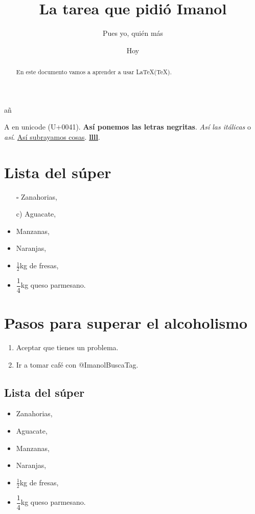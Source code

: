 \documentclass[a4paper,12pt]{article}
\title{La tarea que pidió Imanol} %
\author{Pues yo, quién más}  %
\date{Hoy} %
\begin{document}
\maketitle %
añ 

\begin{abstract}
	En este documento vamos a aprender a usar \LaTeX (\TeX).
\end{abstract}


A en unicode (U+0041). \textbf{Así ponemos las letras negritas}. \emph{Así las itálicas} o \textit{así}. \underline{Así subrayamos cosas}. \textbf{\underline{llll}}.\\
\section{Lista del súper}
\begin{itemize}
\item[$\square$] Zanahorias, 
\item[c)] Aguacate,
\item Manzanas,
\item Naranjas,
\item $\frac{1}{2}$kg de fresas, %
\item $\dfrac{1}{4}$kg queso parmesano.%
\end{itemize}

\section{Pasos para superar el alcoholismo}
\begin{enumerate}
\item Aceptar que tienes un problema.
\item Ir a tomar café con @ImanolBuscaTag.
\end{enumerate}

\subsection{Lista del súper}
\begin{itemize}[label=$\square$]
\item Zanahorias, 
\item Aguacate,
\item Manzanas,
\item Naranjas,
\item $\frac{1}{2}$kg de fresas, %
\item $\dfrac{1}{4}$kg queso parmesano.%
\end{itemize}
\end{document}
